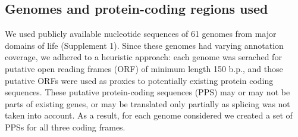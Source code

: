 \subsection{Genomes and protein-coding regions used}
We used publicly available nucleotide sequences of 61 genomes from major
domains of life (Supplement 1). Since these genomes had varying annotation
coverage, we adhered to a heuristic approach: each genome was serached for
putative open reading frames (ORF) of minimum length 150 b.p., and those
putative ORFs were used as proxies to potentially existing protein coding
sequences. These putative protein-coding sequences (PPS) may or may not be
parts of existing genes, or may be translated only partially as splicing was
not taken into account. As a result, for each genome considered we created a
set of PPSs for all three coding frames.
